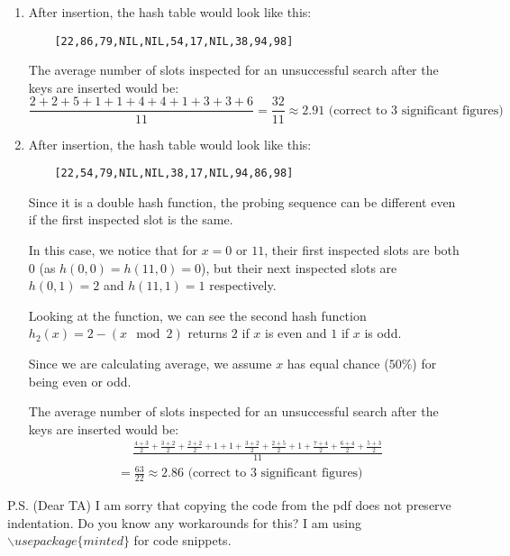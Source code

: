 \documentclass{article}
\begin{document}
\begin{enumerate}
\begin{enumerate}[label=(\alph*)]
        \item After insertion, the hash table would look like this:
        \begin{verbatim}
    [22,86,79,NIL,NIL,54,17,NIL,38,94,98]
        \end{verbatim}
        The average number of slots inspected for an unsuccessful search after the keys are inserted would be:
        \[
        \frac{2+2+5+1+1+4+4+1+3+3+6}{11} = \frac{32}{11} \approx 2.91 \text{ (correct to 3 significant figures)}
        \]

        \item
        After insertion, the hash table would look like this:
        \begin{verbatim}
    [22,54,79,NIL,NIL,38,17,NIL,94,86,98]
        \end{verbatim}
        Since it is a double hash function, the probing sequence can be different even if the first inspected slot is the same.

        In this case, we notice that for $x = 0$ or $11$, their first inspected slots are both $0$ (as $h(0,0) = h(11,0) = 0$), but their next inspected slots are $h(0,1)=2$ and $h(11,1)=1$ respectively.

        Looking at the function, we can see the second hash function $h_2(x) = 2-(x \mod 2)$ returns $2$ if $x$ is even and $1$ if $x$ is odd.

        Since we are calculating average, we assume $x$ has equal chance ($50\%$) for being even or odd.

        The average number of slots inspected for an unsuccessful search after the keys are inserted would be:
        \begin{align*}
        &\quad \ \frac{\frac{4+3}{2}+\frac{3+2}{2}+\frac{2+2}{2}+1+1+\frac{3+2}{2}+\frac{2+5}{2}+1+\frac{7+4}{2}+\frac{6+4}{2}+\frac{5+3}{2}}{11} \\
        &= \frac{63}{22} \approx 2.86 \text{ (correct to 3 significant figures)}
        \end{align*}
    \end{enumerate}

\end{enumerate}

P.S. (Dear TA) I am sorry that copying the code from the pdf does not preserve indentation. Do you know any workarounds for this? I am using $\backslash usepackage\{minted\}$ for code snippets.
\end{document}
